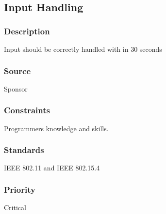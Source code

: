 \subsection{Input Handling}
\subsubsection{Description}
Input should be correctly handled with in 30 seconds 
\subsubsection{Source}
Sponsor
\subsubsection{Constraints}
Programmers knowledge and skills.
\subsubsection{Standards}
IEEE 802.11 and IEEE 802.15.4
\subsubsection{Priority}
Critical